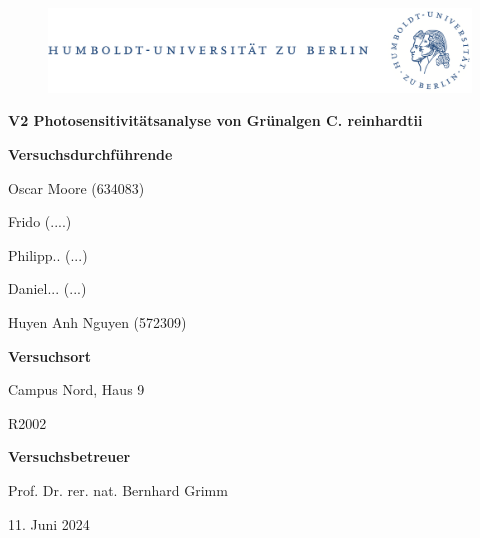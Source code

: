 \documentclass[10pt,a4paper]{article}
\begin{document}
	
	\begin{titlepage}
		\begin{center}
			\begin{figure}[h!tbp]
				\includegraphics[width=\linewidth]{HUlogo.PNG}
			\end{figure}
			\vspace*{0.5cm}
			
			\textcolor{Bluetitle}{\textbf{\huge V2 Photosensitivitätsanalyse von Grünalgen C. reinhardtii}}\par
			
			\vspace*{1.4cm}
			
			\textcolor{Greyish}{\textbf{Versuchsdurchführende}}\par
			\textcolor{Greyish}{Oscar Moore (634083)}\par
			\textcolor{Greyish}{Frido (....)}\par
			\textcolor{Greyish}{Philipp.. (...)}\par
			\textcolor{Greyish}{Daniel... (...)}\par
			\textcolor{Greyish}{Huyen Anh Nguyen (572309)}\par
			\vspace*{0.5cm}
			\textcolor{Greyish}{\textbf{Versuchsort}}\par
			\textcolor{Greyish}{Campus Nord, Haus 9}\par
			\textcolor{Greyish}{R2002}\par
			\vspace*{0.5cm}
			\textcolor{Greyish}{\textbf{Versuchsbetreuer}}\par
			\textcolor{Greyish}{Prof. Dr. rer. nat. Bernhard Grimm}\par
			
			\vspace*{1.0 cm}
			
			\textcolor{Greyish}{11. Juni 2024}\par
			
			\vspace*{1.0 cm}
			
			
		\end{center}
		
		\tableofcontents
		
	\end{titlepage}
	
\end{document}
